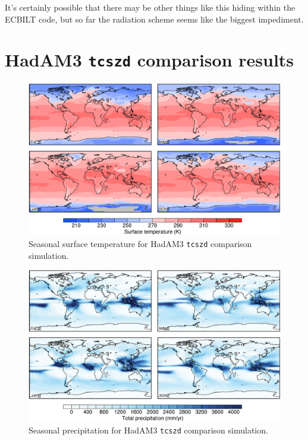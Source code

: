 \documentclass[a4paper,11pt]{article}
\begin{document}
It's certainly possible that there may be other things like this
hiding within the ECBILT code, but so far the radiation scheme seems
like the biggest impediment.


\appendix
\section{HadAM3 \texttt{tcszd} comparison results}
\label{sec:hadam3}

\begin{figure}
  \begin{center}
    \includegraphics[width=\textwidth]{../hadam3-comparison/plots/ts-plots}
  \end{center}
  \caption{Seasonal surface temperature for HadAM3 \texttt{tcszd}
    comparison simulation.}
  \label{fig:ts-hadam3}
\end{figure}

\begin{figure}
  \begin{center}
    \includegraphics[width=\textwidth]{../hadam3-comparison/plots/pp-plots}
  \end{center}
  \caption{Seasonal precipitation for HadAM3 \texttt{tcszd} comparison
    simulation.}
  \label{fig:pp-hadam3}
\end{figure}
\end{document}
